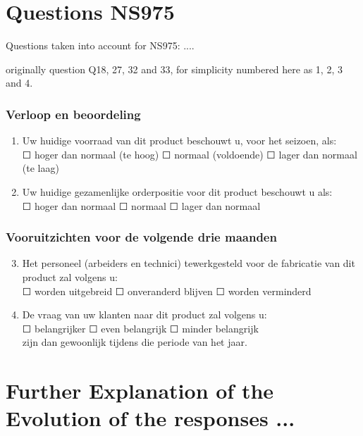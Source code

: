 \documentclass[12pt,a4paper,oneside]{book}
\begin{document}
\section{Questions NS975}
\label{Appendix: Question NS975 description}
Questions taken into account for NS975:
....

originally question Q18, 27, 32 and 33, for simplicity numbered here as 1, 2, 3 and 4.

\subsubsection*{Verloop en beoordeling}
\begin{enumerate}
    \item Uw huidige voorraad van dit product beschouwt u, voor het seizoen, als: \\
	$\Square$	hoger dan normaal (te hoog)	$\Square$	normaal (voldoende)	$\Square$ lager dan normaal (te laag)
	
    \item Uw huidige gezamenlijke orderpositie voor dit product beschouwt u als: \\
	$\Square$ hoger dan normaal $\Square$ normaal $\Square$ lager dan normaal
\end{enumerate}

\subsubsection*{Vooruitzichten voor de volgende drie maanden} 
\begin{enumerate}
\setcounter{enumi}{2}
    \item Het personeel (arbeiders en technici) tewerkgesteld voor de fabricatie van dit product zal volgens u: \\
	$\Square$ worden uitgebreid $\Square$ onveranderd blijven $\Square$ worden verminderd
						
    \item De vraag van uw klanten naar dit product zal volgens u:  \\
	$\Square$ belangrijker $\Square$ even belangrijk $\Square$ minder belangrijk \\	
	zijn dan gewoonlijk tijdens die periode van het jaar.
\end{enumerate}

\newpage
\section*{Further Explanation of the Evolution of the responses ...}
\label{sec:appendix explanations EIR}
\end{document}

